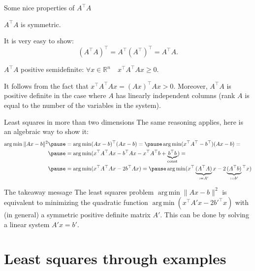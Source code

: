 \documentclass[UKenglish,aspectratio=169]{beamer}
\DeclareMathOperator*{\argmin}{arg\,min}
\begin{document}
\begin{frame}{Some nice properties of $A^\top A$}
\begin{theorem}
$A^\top A$ is symmetric.
\end{theorem}
\pause
It is very easy to show:
$$
(A^\top A)^\top = A^\top (A^\top)^\top = A^\top A.
$$

\pause
\begin{theorem}
$A^\top A$ positive semidefinite: $\forall x\in \mathbb R^n\quad x^\top A^\top A x \geq 0.$
\end{theorem}
\pause
It follows from the fact that $x^\top A^\top A x = (A x)^\top A x > 0$.
Moreover, $A^\top A$ is positive definite in the case where $A$ has linearly independent columns (rank $A$ is equal to the number of the variables in the system).
\end{frame}

\begin{frame}{Least squares in more than two dimensions}
The same reasoning applies, here is an algebraic way to show it:
$$
\begin{aligned}
\argmin \| Ax - b \|^2 \pause &= \argmin (Ax-b)^\top (Ax-b) = \pause
 \argmin(x^\top A^\top - b^\top)(Ax-b) = \\ \pause
& = \argmin(x^\top A^\top A x - b^\top Ax - x^\top A^\top b + \underbrace{b^\top b}_{\rm const})=\\ \pause
& = \argmin(x^\top A^\top A x - 2b^\top Ax) = \pause
 \argmin(x^\top \underbrace{(A^\top A)}_{:=A'} x - 2\underbrace{(A^\top b)}_{:=b'}\phantom{}^\top x)
\end{aligned}
$$
\pause
\begin{block}{The takeaway message}
The least squares problem $\argmin \| Ax - b \|^2$  is equivalent to minimizing the quadratic function $\argmin \left(x^\top A' x - 2b'^\top x\right)$
with (in general) a symmetric positive definite matrix $A'$. This can be done by solving a linear system $A'x = b'$.
\end{block}
\end{frame}

\section{Least squares through examples}
\end{document}
